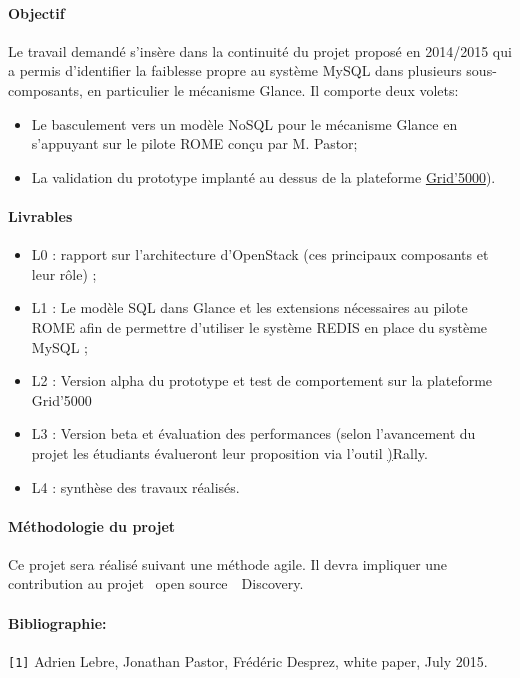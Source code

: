 \documentclass[a4paper,11pt]{article}
\begin{document}
\begin{note}
\paragraph*{Objectif\\}

  Le travail demandé s'insère dans la continuité du projet proposé en
  2014/2015 qui a permis d'identifier la faiblesse propre au système MySQL dans
  plusieurs sous-composants, en particulier le mécanisme Glance. Il comporte deux volets:
\begin{itemize}
\item Le basculement vers un modèle NoSQL pour le mécanisme Glance en s'appuyant sur le pilote ROME conçu par M. Pastor;
\item La validation du prototype implanté au dessus de la
  plateforme \href{Grid'5000}{Grid'5000}).
\end{itemize}

\paragraph*{Livrables\\}

\begin{itemize}
\item L0 : rapport sur l'architecture d'OpenStack (ces principaux
  composants et leur rôle) ; 
\item L1 : Le modèle SQL dans Glance et les extensions nécessaires au pilote ROME afin de permettre d'utiliser le système REDIS en place du système MySQL ; 
\item L2 : Version alpha du prototype et test de comportement sur la plateforme Grid'5000
\item L3 : Version beta et évaluation des performances (selon l'avancement du
  projet les étudiants évalueront leur proposition via l'outil
  \href{https://wiki.openstack.org/wiki/Rally}){Rally}.
\item L4 : synthèse des travaux réalisés.
\end{itemize}

\paragraph*{Méthodologie du projet\\}
Ce projet sera réalisé suivant une méthode agile. Il devra impliquer une
contribution au projet \og~open source~\fg\ Discovery.


\paragraph*{Bibliographie:\\}
%
\texttt{[1]} Adrien Lebre, Jonathan Pastor, Frédéric Desprez, white paper, July 2015.\\

\end{note}
\end{document}

